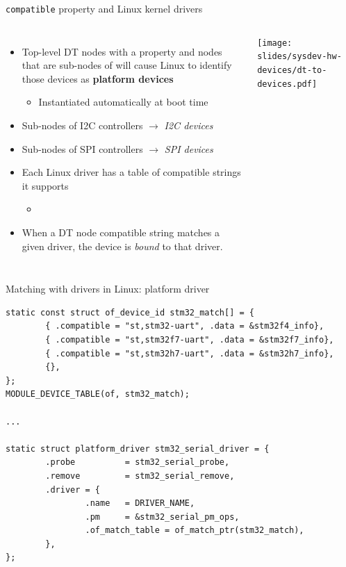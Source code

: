 \begin{frame}{{\tt compatible} property and Linux kernel drivers}
  \begin{columns}
    \begin{itemize}
    \item Top-level DT nodes with a  property and
      nodes that are sub-nodes of  will cause Linux
      to identify those devices as {\bf platform devices}
      \begin{itemize}
      \item Instantiated automatically at boot time
      \end{itemize}
    \item Sub-nodes of I2C controllers $\rightarrow$ {\em I2C devices}
    \item Sub-nodes of SPI controllers $\rightarrow$ {\em SPI devices}
    \item Each Linux driver has a table of compatible strings it supports
      \begin{itemize}
      \item {}
      \end{itemize}
    \item When a DT node compatible string matches a given driver, the
      device is {\em bound} to that driver.
    \end{itemize}
    \texttt{[image: slides/sysdev-hw-devices/dt-to-devices.pdf]}
  \end{columns}
\end{frame}

\begin{frame}[fragile]{Matching with drivers in Linux: platform driver}
  \begin{block}{}
    {\tiny
\begin{verbatim}
static const struct of_device_id stm32_match[] = {
        { .compatible = "st,stm32-uart", .data = &stm32f4_info},
        { .compatible = "st,stm32f7-uart", .data = &stm32f7_info},
        { .compatible = "st,stm32h7-uart", .data = &stm32h7_info},
        {},
};
MODULE_DEVICE_TABLE(of, stm32_match);

...

static struct platform_driver stm32_serial_driver = {
        .probe          = stm32_serial_probe,
        .remove         = stm32_serial_remove,
        .driver = {
                .name   = DRIVER_NAME,
                .pm     = &stm32_serial_pm_ops,
                .of_match_table = of_match_ptr(stm32_match),
        },
};
\end{verbatim}
    }
  \end{block}
\end{frame}

